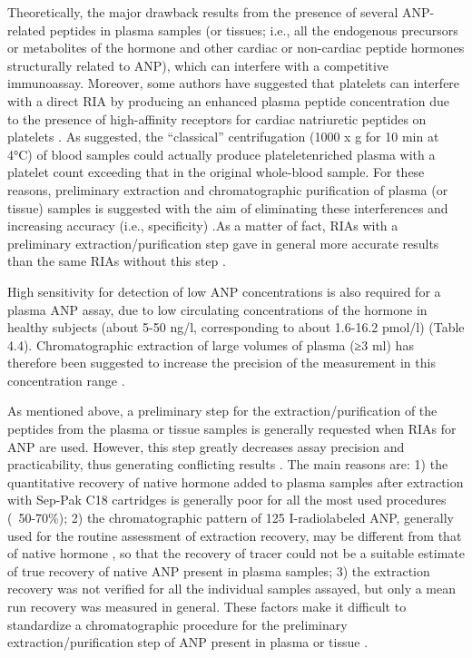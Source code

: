 \documentclass[14pt,a4paper,onecolumn]{extarticle}
\begin{document}
Theoretically, the major drawback results from the presence of several ANP-related
peptides in plasma samples (or tissues; i.e., all the endogenous precursors or metabolites of the hormone and other cardiac or non-cardiac peptide hormones structurally
related to ANP), which can interfere with a competitive immunoassay. Moreover, some
authors have suggested that platelets can interfere with a direct RIA by producing an
enhanced plasma peptide concentration due to the presence of high-affinity receptors
for cardiac natriuretic peptides on platelets \citep{bib224}. As suggested, the “classical” centrifugation (1000 x g for 10 min at 4°C) of blood samples could actually produce plateletenriched plasma with a platelet count exceeding that in the original whole-blood sample. For these reasons, preliminary extraction and chromatographic purification of
plasma (or tissue) samples is suggested with the aim of eliminating these interferences
and increasing accuracy (i.e., specificity) \citep{bib224} \citep{bib229} \citep{bib230}.As a matter of fact, RIAs with a preliminary extraction/purification step gave in general more accurate results than the
same RIAs without this step \citep{bib224} \citep{bib229}.

High sensitivity for detection of low ANP concentrations is also required for a plasma ANP assay, due to low circulating concentrations of the hormone in healthy subjects (about 5-50 ng/l, corresponding to about 1.6-16.2 pmol/l) (Table 4.4). Chromatographic extraction of large volumes of plasma (≥3 ml) has therefore been suggested to
increase the precision of the measurement in this concentration range \citep{bib224} \citep{bib229} \citep{bib230}.

As mentioned above, a preliminary step for the extraction/purification of the peptides from the plasma or tissue samples is generally requested when RIAs for ANP are
used. However, this step greatly decreases assay precision and practicability, thus generating conflicting results \citep{bib230}. The main reasons are: 1) the quantitative recovery of
native hormone added to plasma samples after extraction with Sep-Pak C18 cartridges
is generally poor for all the most used procedures (~50-70\%); 2) the chromatographic
pattern of 125 I-radiolabeled ANP, generally used for the routine assessment of extraction
recovery, may be different from that of native hormone \citep{bib22} \citep{bib229} \citep{bib230}, so that the recovery
of tracer could not be a suitable estimate of true recovery of native ANP present in plasma samples; 3) the extraction recovery was not verified for all the individual samples
assayed, but only a mean run recovery was measured in general. These factors make it
difficult to standardize a chromatographic procedure for the preliminary extraction/purification step of ANP present in plasma or tissue \citep{bib21} \citep{bib22} \citep{bib230}.
\end{document}
